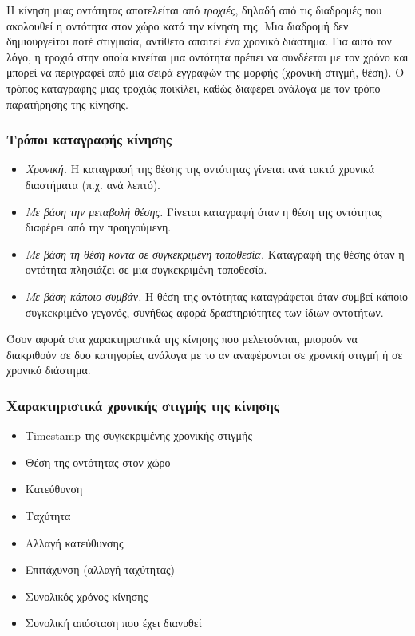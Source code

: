 \documentclass[12pt,twoside,openright]{report}
\begin{document}
Η κίνηση μιας οντότητας αποτελείται από \emph{τροχιές}, δηλαδή από τις διαδρομές που ακολουθεί η οντότητα στον χώρο κατά την κίνηση της. Μια διαδρομή δεν δημιουργείται ποτέ στιγμιαία, αντίθετα απαιτεί ένα χρονικό διάστημα. Για αυτό τον λόγο, η τροχιά στην οποία κινείται μια οντότητα πρέπει να συνδέεται με τον χρόνο και μπορεί να περιγραφεί από μια σειρά εγγραφών της μορφής (χρονική στιγμή, θέση). Ο τρόπος καταγραφής μιας τροχιάς ποικίλει, καθώς διαφέρει ανάλογα με τον τρόπο παρατήρησης της κίνησης. 

\subsubsection*{Τρόποι καταγραφής κίνησης}
\begin{itemize}
  \item \emph{Χρονική.} Η καταγραφή της θέσης της οντότητας γίνεται ανά τακτά χρονικά διαστήματα (π.χ. ανά λεπτό).
  \item \emph{Με βάση την μεταβολή θέσης.} Γίνεται καταγραφή όταν η θέση της οντότητας διαφέρει από την προηγούμενη.
  \item	\emph{Με βάση τη θέση κοντά σε συγκεκριμένη τοποθεσία.} Καταγραφή της θέσης όταν η οντότητα πλησιάζει σε μια συγκεκριμένη τοποθεσία.
  \item \emph{Με βάση κάποιο συμβάν.} Η θέση της οντότητας καταγράφεται όταν συμβεί κάποιο συγκεκριμένο γεγονός, συνήθως αφορά δραστηριότητες των ίδιων οντοτήτων.  
\end{itemize}

Όσον αφορά στα χαρακτηριστικά της κίνησης που μελετούνται, μπορούν να διακριθούν σε δυο κατηγορίες ανάλογα με το αν αναφέρονται σε χρονική στιγμή ή σε χρονικό διάστημα.
\subsubsection*{Χαρακτηριστικά χρονικής στιγμής της κίνησης}
\begin{itemize}
  \item \lt Timestamp \gt της συγκεκριμένης χρονικής στιγμής
  \item Θέση της οντότητας στον χώρο
  \item	Κατεύθυνση
  \item Ταχύτητα
  \item Αλλαγή κατεύθυνσης
  \item Επιτάχυνση (αλλαγή ταχύτητας)
  \item Συνολικός χρόνος κίνησης
  \item Συνολική απόσταση που έχει διανυθεί
\end{itemize}
\end{document}
